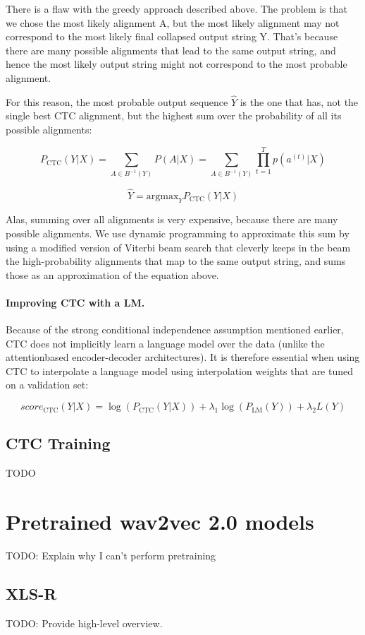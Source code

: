 There is a flaw with the greedy approach described above. The problem is that we chose the most likely alignment A, but the
most likely alignment may not correspond to the most likely final collapsed output
string Y. That's because there are many possible alignments that lead to the same
output string, and hence the most likely output string might not correspond to the
most probable alignment.

For this reason, the most probable output sequence $\hat{Y}$ is the one that has, not
the single best CTC alignment, but the highest sum over the probability of all its
possible alignments:

\begin{equation}
    P_{\text{CTC}}(Y|X) =  \sum\limits_{A \in B^{-1}(Y)} P(A|X) = \sum\limits_{A \in B^{-1}(Y)} \prod\limits_{t=1}^{T} p(a^{(t)} | X)
\end{equation}
    
\begin{equation}
\hat{Y} = \text{argmax}_Y P_{\text{CTC}}(Y|X)
\end{equation}

Alas, summing over all alignments is very expensive, because there are many possible alignments.
We use dynamic programming to approximate this sum by using a modified version of Viterbi beam search that cleverly
keeps in the beam the high-probability alignments that map to the same output string,
and sums those as an approximation of the equation above.

\paragraph*{Improving CTC with a LM.} Because of the strong conditional independence assumption mentioned earlier,
CTC does not implicitly learn a language model over the data (unlike the attentionbased encoder-decoder architectures). It is therefore essential when using CTC to
interpolate a language model using interpolation weights that are tuned on a validation set:

\begin{equation}
    \textit{score}_{\text{CTC}}(Y|X) = \log\left(P_{\text{CTC}}(Y|X)\right) + \lambda_1 \log\left(P_{\text{LM}}(Y)\right) + \lambda_2 L(Y)
\end{equation}
    

\subsection{CTC Training}
TODO



\section{Pretrained wav2vec 2.0 models}
TODO: Explain why I can't perform pretraining

\subsection{XLS-R}
TODO: Provide high-level overview.
